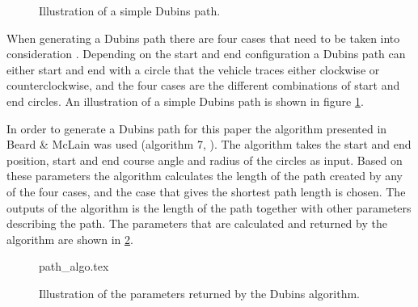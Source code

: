 \begin{figure}[]
    \centering
    \caption{Illustration of a simple Dubins path.}
	\label{fig:dubins_example}
\end{figure}

When generating a Dubins path there are four cases that need to be taken into consideration \cite{suaBEARD}. Depending on the start and end configuration a Dubins path can either start and end with a circle that the vehicle traces either clockwise or counterclockwise, and the four cases are the different combinations of start and end circles. An illustration of a simple Dubins path is shown in figure \ref{fig:dubins_example}.

In order to generate a Dubins path for this paper the algorithm presented in Beard \& McLain was used (algorithm 7, \cite{suaBEARD}). The algorithm takes the start and end position, start and end course angle and radius of the circles as input. Based on these parameters the algorithm calculates the length of the path created by any of the four cases, and the case that gives the shortest path length is chosen. The outputs of the algorithm is the length of the path together with other parameters describing the path. The parameters that are calculated and returned by the algorithm are shown in \ref{fig:dubins_algorithm}.

\begin{figure}
	{path_algo.tex}
	\caption{Illustration of the parameters returned by the Dubins algorithm.}
	\label{fig:dubins_algorithm}
\end{figure}

